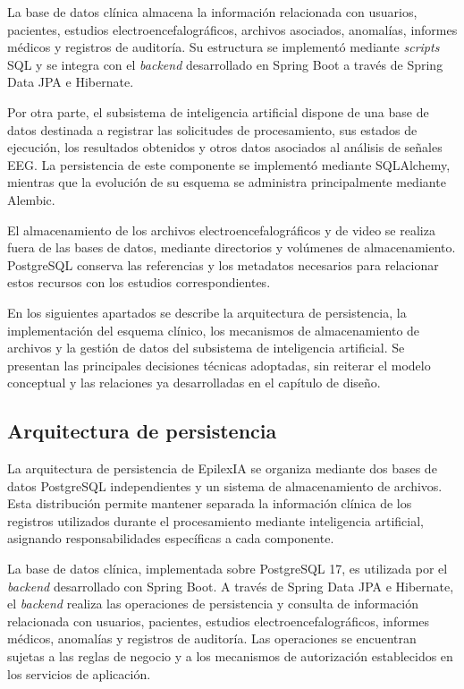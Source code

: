La base de datos clínica almacena la información relacionada
con usuarios, pacientes, estudios electroencefalográficos,
archivos asociados, anomalías, informes médicos y registros
de auditoría. Su estructura se implementó mediante \textit{scripts}
SQL y se integra con el \textit{backend} desarrollado en Spring Boot
a través de Spring Data JPA e Hibernate.

Por otra parte, el subsistema de inteligencia artificial
dispone de una base de datos destinada a registrar las
solicitudes de procesamiento, sus estados de ejecución,
los resultados obtenidos y otros datos asociados al análisis
de señales EEG. La persistencia de este componente se
implementó mediante SQLAlchemy, mientras que la evolución
de su esquema se administra principalmente mediante Alembic.

El almacenamiento de los archivos electroencefalográficos
y de video se realiza fuera de las bases de datos, mediante
directorios y volúmenes de almacenamiento. PostgreSQL conserva
las referencias y los metadatos necesarios para relacionar
estos recursos con los estudios correspondientes.

En los siguientes apartados se describe la arquitectura de
persistencia, la implementación del esquema clínico, los
mecanismos de almacenamiento de archivos y la gestión de
datos del subsistema de inteligencia artificial. Se
presentan las principales decisiones técnicas adoptadas,
sin reiterar el modelo conceptual y las relaciones ya
desarrolladas en el capítulo de diseño.


\subsection{Arquitectura de persistencia}

La arquitectura de persistencia de EpilexIA se organiza mediante
dos bases de datos PostgreSQL independientes y un sistema de
almacenamiento de archivos. Esta distribución permite mantener
separada la información clínica de los registros utilizados
durante el procesamiento mediante inteligencia artificial,
asignando responsabilidades específicas a cada componente.

La base de datos clínica, implementada sobre PostgreSQL 17,
es utilizada por el \textit{backend} desarrollado con Spring Boot.
A través de Spring Data JPA e Hibernate, el \textit{backend} realiza
las operaciones de persistencia y consulta de información
relacionada con usuarios, pacientes, estudios
electroencefalográficos, informes médicos, anomalías y
registros de auditoría. Las operaciones se encuentran
sujetas a las reglas de negocio y a los mecanismos de
autorización establecidos en los servicios de aplicación.

